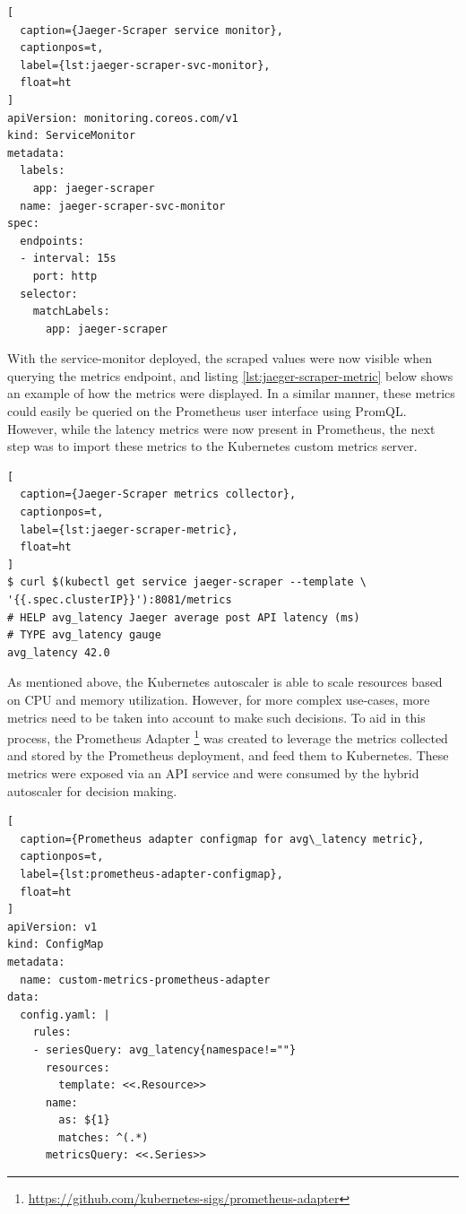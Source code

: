 \begin{lstlisting}[
  caption={Jaeger-Scraper service monitor},
  captionpos=t,
  label={lst:jaeger-scraper-svc-monitor},
  float=ht
]
apiVersion: monitoring.coreos.com/v1
kind: ServiceMonitor
metadata:
  labels:
    app: jaeger-scraper
  name: jaeger-scraper-svc-monitor
spec:
  endpoints:
  - interval: 15s
    port: http
  selector:
    matchLabels:
      app: jaeger-scraper
\end{lstlisting}

With the service-monitor deployed, the scraped values were now visible when querying the metrics endpoint, and listing \ref{lst:jaeger-scraper-metric} below shows an example of how the metrics were displayed. In a similar manner, these metrics could easily be queried on the Prometheus user interface using PromQL. However, while the latency metrics were now present in Prometheus, the next step was to import these metrics to the Kubernetes custom metrics server.\par

\begin{lstlisting}[
  caption={Jaeger-Scraper metrics collector},
  captionpos=t,
  label={lst:jaeger-scraper-metric},
  float=ht
]
$ curl $(kubectl get service jaeger-scraper --template \
'{{.spec.clusterIP}}'):8081/metrics
# HELP avg_latency Jaeger average post API latency (ms)
# TYPE avg_latency gauge
avg_latency 42.0
\end{lstlisting}

As mentioned above, the Kubernetes autoscaler is able to scale resources based on CPU and memory utilization. However, for more complex use-cases, more metrics need to be taken into account to make such decisions. To aid in this process, the Prometheus Adapter \footnote{\url{https://github.com/kubernetes-sigs/prometheus-adapter}} was created to leverage the metrics collected and stored by the Prometheus deployment, and feed them to Kubernetes. These metrics were exposed via an API service and were consumed by the hybrid autoscaler for decision making.\par

\begin{lstlisting}[
  caption={Prometheus adapter configmap for avg\_latency metric},
  captionpos=t,
  label={lst:prometheus-adapter-configmap},
  float=ht
]
apiVersion: v1
kind: ConfigMap
metadata:
  name: custom-metrics-prometheus-adapter
data:
  config.yaml: |
    rules:
    - seriesQuery: avg_latency{namespace!=""}
      resources:
        template: <<.Resource>>
      name:
        as: ${1}
        matches: ^(.*)
      metricsQuery: <<.Series>>
\end{lstlisting}

